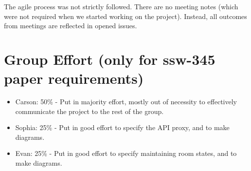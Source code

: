 The agile process was not strictly followed. There are no meeting notes (which were not required when we started working on the project). Instead, all outcomes from meetings are reflected in opened issues.

\section{Group Effort (only for ssw-345 paper requirements)}

\begin{itemize}
	\item Carson: 50\% - Put in majority effort, mostly out of necessity to effectively communicate the project to the rest of the group.
	\item Sophia: 25\% - Put in good effort to specify the API proxy, and to make diagrams.
	\item Evan: 25\% - Put in good effort to specify maintaining room states, and to make diagrams.
\end{itemize}